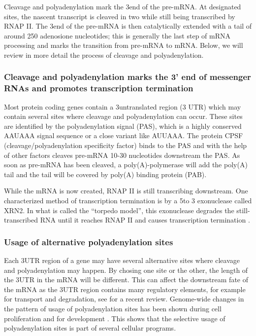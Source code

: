 Cleavage and polyadenylation mark the 3\p end of the pre-mRNA. At designated
sites, the nascent transcript is cleaved in two while still being transcribed
by RNAP II. The 3\p end of the pre-mRNA is then catalytically extended with a
tail of around 250 adenosione nucleotides; this is generally the last step of
mRNA processing and marks the transition from pre-mRNA to mRNA. Below, we will
review in more detail the process of cleavage and polyadenylation.

\subsubsection{Cleavage and polyadenylation marks the 3' end of messenger RNAs
and promotes transcription termination}
Most protein coding genes contain a 3\p untranslated region (3\p
UTR) which may contain several sites where cleavage and polyadenylation can
occur. These sites are identified by the polyadenylation signal (PAS), which is
a highly conserved AAUAAA signal sequence or a close variant like AUUAAA. The
protein CPSF (cleavage/polyadenylation specificity factor) binds to the PAS and
with the help of other factors cleaves pre-mRNA 10-30 nucleotides downstream
the PAS. As soon as pre-mRNA has been cleaved, a poly(A)-polymerase will add
the poly(A) tail and the tail will be covered by poly(A) binding protein (PAB).

While the mRNA is now created, RNAP II is still transcribing downstream. One
characterized method of transcription termination is by a 5\p to 3\p
exonuclease called XRN2. In what is called the ``torpedo model'', this
exonuclease degrades the still-transcribed RNA until it reaches RNAP II and
causes transcription termination \cite{kuehner_unravelling_2011}.

\subsubsection{Usage of alternative polyadenylation sites}
Each 3\p UTR region of a gene may have several alternative sites where cleavage
and polyadenylation may happen. By chosing one site or the other, the length of
the 3\p UTR in the mRNA will be different. This can affect the
downstream fate of the mRNA as the 3\p UTR region contains many regulatory
elements, for example for transport and degradation, see
\cite{lutz_alternative_2011} for a recent review. Genome-wide changes in the
pattern of usage of polyadenylation sites has been shown during cell
proliferation \cite{sandberg_proliferating_2008} and for development
\cite{hilgers_neural-specific_2011, ji_progressive_2009}. This shows that the
selective usage of polyadenylation sites is part of several cellular programs.

